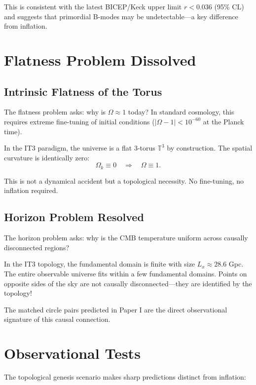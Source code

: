 \documentclass[12pt,a4paper]{article}
\begin{document}
This is consistent with the latest BICEP/Keck upper limit $r < 0.036$ (95\% CL) \citep{BICEP2021} and suggests that primordial B-modes may be undetectable---a key difference from inflation.

\section{Flatness Problem Dissolved}

\subsection{Intrinsic Flatness of the Torus}

The flatness problem asks: why is $\Omega \approx 1$ today? In standard cosmology, this requires extreme fine-tuning of initial conditions ($|\Omega - 1| < 10^{-60}$ at the Planck time).

In the IT3 paradigm, the universe is a flat 3-torus $\mathbb{T}^3$ by construction. The spatial curvature is identically zero:
\begin{equation}
\Omega_k \equiv 0 \quad \Rightarrow \quad \Omega \equiv 1.
\end{equation}

This is not a dynamical accident but a topological necessity. No fine-tuning, no inflation required.

\subsection{Horizon Problem Resolved}

The horizon problem asks: why is the CMB temperature uniform across causally disconnected regions?

In the IT3 topology, the fundamental domain is finite with size $L_x \approx 28.6$ Gpc. The entire observable universe fits within a few fundamental domains. Points on opposite sides of the sky are not causally disconnected---they are identified by the topology!

The matched circle pairs predicted in Paper I are the direct observational signature of this causal connection.

\section{Observational Tests}

The topological genesis scenario makes sharp predictions distinct from inflation:
\end{document}

